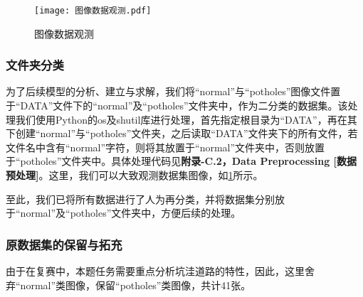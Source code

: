 \documentclass{MathorCupmodeling}
\begin{document}
\begin{table}[H]
	\centering
	\caption{异常标注图片的处理}
	\label{tab:异常图片处理}
\end{table}

\begin{figure}[H]
	\centering
	\texttt{[image: 图像数据观测.pdf]}
	\caption{图像数据观测}
	\label{fig:图像数据观测}
\end{figure}
	\subsubsection{文件夹分类}
	为了后续模型的分析、建立与求解，我们将“normal”与“potholes”图像文件置于“DATA”文件下的“normal”及“potholes”文件夹中，作为二分类的数据集。该处理我们使用Python的os及shutil库进行处理，首先指定根目录为“DATA”，再在其下创建“normal”与“potholes”文件夹，之后读取“DATA”文件夹下的所有文件，若文件名中含有“normal”字符，则将其放置于“normal”文件夹中，否则放置于“potholes”文件夹中。具体处理代码见\textbf{附录-C.2，Data Preprocessing [数据预处理]}。这里，我们可以大致观测数据集图像，如\textcolor{blue}{\cref{fig:图像数据观测}}所示。

	至此，我们已将所有数据进行了人为再分类，并将数据集分别放于“normal”及“potholes”文件夹中，方便后续的处理。
	
	\subsubsection{原数据集的保留与拓充}
	由于在复赛中，本题任务需要重点分析坑洼道路的特性，因此，这里舍弃“normal”类图像，保留“potholes”类图像，共计41张。
\end{document}
